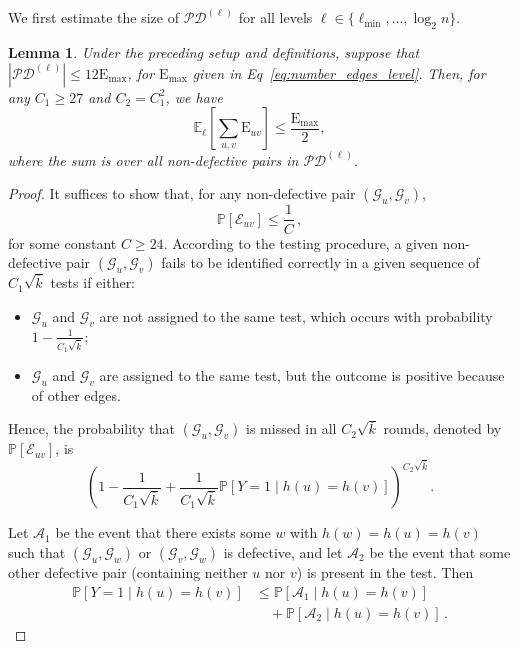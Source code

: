 \documentclass[journal]{IEEEtran}
\newcommand{\rEm}{\mathrm{E}_{\max}}
\newtheorem{lemma}{Lemma}
\theoremstyle{definition}
\theoremstyle{definition}
\newcommand{\Ac}{\mathcal{A}}
\newcommand{\Ec}{\mathcal{E}}
\newcommand{\Gc}{\mathcal{G}}
\newcommand{\EE}{\mathbb{E}}
\newcommand{\PP}{\mathbb{P}}
\newcommand{\rE}{\mathrm{E}}
\newcommand{\kb}{\overline{k}}
\begin{document}
We first estimate the size of $\mathcal{PD}^{(\ell)}$ for all levels $\ell \in \{\ell_{\min},\dots,\log_2 n \}$.



\begin{lemma}
\label{lem:expectation}
Under the preceding setup and definitions, suppose that $|\mathcal{PD}^{(\ell)}| \leq 12 \rEm$, for $\rEm$ given in Eq~\eqref{eq:number_edges_level}. 
Then, for any $C_1 \geq 27$ and $C_2 = C_1^2$, we have
\[
\EE_{\ell} \left[\sum_{u,v} \rE_{uv} \right] \leq \frac{\rEm}{2},
\]
where the sum is over all non-defective pairs in $\mathcal{PD}^{(\ell)}$. 
\end{lemma}

\begin{proof}
It suffices to show that, for any non-defective pair $(\Gc_u,\Gc_v)$,
\begin{equation}
\label{eq:bound_pair_not_identify}
    \PP[\Ec_{uv}] \leq \frac{1}{C} \, ,
\end{equation}
for some constant $C \geq 24$. According to the testing procedure, a given non-defective pair $(\Gc_u,\Gc_v)$ fails to be identified correctly in a given sequence of $C_1\sqrt{\kb}$ tests if either:
\begin{itemize}
  \item $\Gc_u$ and $\Gc_v$ are not assigned to the same test, which occurs with probability $1 - \frac{1}{C_1\sqrt{\kb}}$;
  \item $\Gc_u$ and $\Gc_v$ are assigned to the same test, but the outcome is positive because of other edges.
\end{itemize}
Hence, the probability that $(\Gc_u,\Gc_v)$ is missed in all $C_2\sqrt{\kb}$ rounds, denoted by $\PP[\Ec_{uv}]$, is
\begin{equation}
\label{eq:prob_non_defective_pair}
    \left(1 - \frac{1}{C_1\sqrt{\kb}} + \frac{1}{C_1\sqrt{\kb}} \PP[Y=1 \mid h(u)=h(v)] \right)^{C_2\sqrt{\kb}}.
\end{equation}

Let $\Ac_1$ be the event that there exists some $w$ with $h(w)=h(u)=h(v)$ such that $(\Gc_u,\Gc_w)$ or $(\Gc_v,\Gc_w)$ is defective, and let $\Ac_2$ be the event that some other defective pair (containing neither $u$ nor $v$) is present in the test. Then
\[
\begin{aligned}
\PP[Y=1 \mid h(u)=h(v)]
&\le \PP[\Ac_1 \mid h(u)=h(v)] \\
&\quad + \PP[\Ac_2 \mid h(u)=h(v)] \, .
\end{aligned}
\]





\end{proof}
\end{document}
